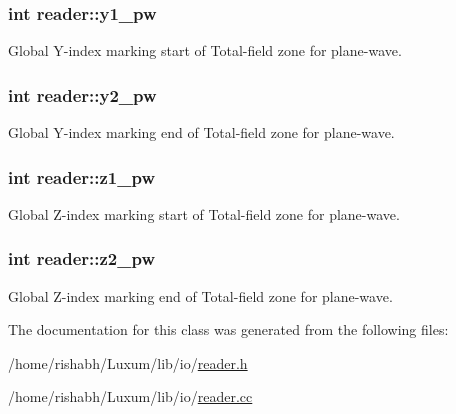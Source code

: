 \subsubsection[{\texorpdfstring{y1\+\_\+pw}{y1_pw}}]{\setlength{\rightskip}{0pt plus 5cm}int reader\+::y1\+\_\+pw}\hypertarget{classreader_a5c5e482cb9440c5975ec0aa67482b2e8}{}\label{classreader_a5c5e482cb9440c5975ec0aa67482b2e8}
Global Y-\/index marking start of Total-\/field zone for plane-\/wave. 
\subsubsection[{\texorpdfstring{y2\+\_\+pw}{y2_pw}}]{\setlength{\rightskip}{0pt plus 5cm}int reader\+::y2\+\_\+pw}\hypertarget{classreader_a31f454d30a8fa6d4d5bd5cfd8cc56814}{}\label{classreader_a31f454d30a8fa6d4d5bd5cfd8cc56814}
Global Y-\/index marking end of Total-\/field zone for plane-\/wave. 
\subsubsection[{\texorpdfstring{z1\+\_\+pw}{z1_pw}}]{\setlength{\rightskip}{0pt plus 5cm}int reader\+::z1\+\_\+pw}\hypertarget{classreader_a8e84a504d6a8e55482d34f1db450856c}{}\label{classreader_a8e84a504d6a8e55482d34f1db450856c}
Global Z-\/index marking start of Total-\/field zone for plane-\/wave. 
\subsubsection[{\texorpdfstring{z2\+\_\+pw}{z2_pw}}]{\setlength{\rightskip}{0pt plus 5cm}int reader\+::z2\+\_\+pw}\hypertarget{classreader_aca3150cf87a7064974848902c1d1d441}{}\label{classreader_aca3150cf87a7064974848902c1d1d441}
Global Z-\/index marking end of Total-\/field zone for plane-\/wave. 

The documentation for this class was generated from the following files\+:\begin{DoxyCompactItemize}
\item 
/home/rishabh/\+Luxum/lib/io/\hyperlink{reader_8h}{reader.\+h}\item 
/home/rishabh/\+Luxum/lib/io/\hyperlink{reader_8cc}{reader.\+cc}\end{DoxyCompactItemize}
